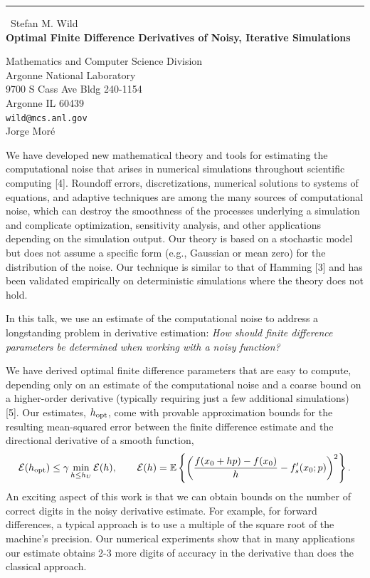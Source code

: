 \documentclass{report}
\begin{document}
\begin{center}
\rule{6in}{1pt} \
{\large Stefan M. Wild \\
{\bf Optimal Finite Difference Derivatives of Noisy, Iterative Simulations}}

Mathematics and Computer Science Division \\ Argonne National Laboratory \\ 9700 S Cass Ave Bldg 240-1154 \\ Argonne IL 60439
\\
{\tt wild@mcs.anl.gov}\\
Jorge Mor\'e\end{center}

We have developed new mathematical theory and tools for estimating the
computational noise that arises in numerical simulations throughout
scientific computing
[4].
Roundoff errors, discretizations, numerical solutions to systems of
equations, and adaptive techniques are among the many sources
of computational noise, which can destroy the smoothness of
the processes underlying a simulation and complicate optimization,
sensitivity analysis, and other applications depending on the
simulation output.
Our theory is based on a stochastic model but does not
assume a specific form (e.g., Gaussian or mean zero)
for the distribution of the noise. Our technique is similar to that of
Hamming
[3]
and has been validated empirically on
deterministic simulations where the theory does not hold.

In this talk, we use an estimate of the computational noise to address a
longstanding problem in derivative estimation:
\emph{How should finite difference parameters be determined
when working with a noisy function?}

We have derived optimal finite difference parameters that are easy to
compute, depending only on an estimate of the computational noise and a
coarse bound on a higher-order derivative (typically requiring just a few
additional simulations)
[5].
Our estimates, $h_{\rm opt}$,
come with provable
approximation bounds for the resulting mean-squared error between the
finite difference estimate and the directional derivative of a smooth
function,
\begin{equation*}
\mathcal{E}(h_{\rm opt}) \leq \gamma \min \limits_{h\leq h_U}
\mathcal{E}(h), \qquad
\mathcal{E}(h) = \mathbb{E}
\left\{\left(\frac{f(x_0+hp)-f(x_0)}{h}-f'_s(x_0;p) \right)^2 \right\}.
\label{eq:bound}
\end{equation*}
An exciting aspect of this work is that we can obtain bounds on the number
of correct digits in the noisy derivative estimate. For example, for
forward differences, a typical approach is to use a multiple of the square
root of the machine's precision. Our numerical experiments show that in
many applications our estimate obtains 2-3 more digits of accuracy in the
derivative than does the classical approach.
\end{document}
